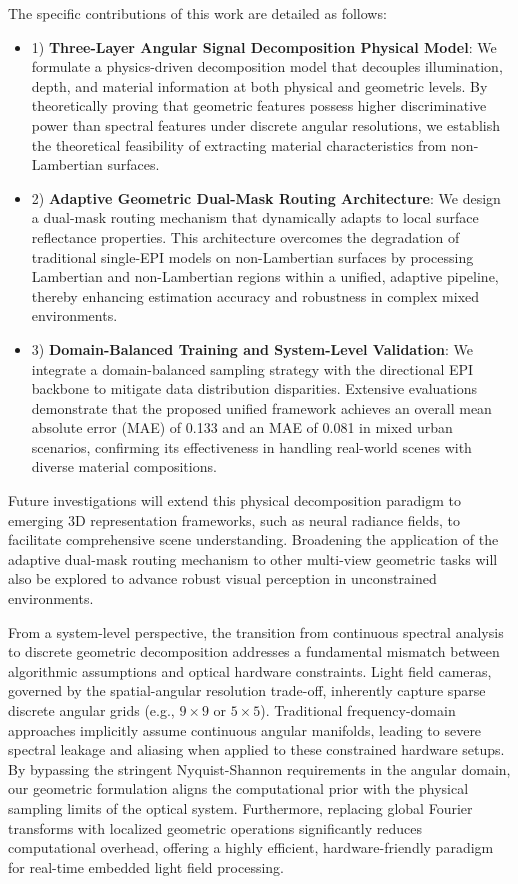 \documentclass[lettersize,journal]{IEEEtran}
\begin{document}
The specific contributions of this work are detailed as follows:
\begin{itemize}
\item 1) \textbf{Three-Layer Angular Signal Decomposition Physical Model}: We formulate a physics-driven decomposition model that decouples illumination, depth, and material information at both physical and geometric levels. By theoretically proving that geometric features possess higher discriminative power than spectral features under discrete angular resolutions, we establish the theoretical feasibility of extracting material characteristics from non-Lambertian surfaces.
\item 2) \textbf{Adaptive Geometric Dual-Mask Routing Architecture}: We design a dual-mask routing mechanism that dynamically adapts to local surface reflectance properties. This architecture overcomes the degradation of traditional single-EPI models on non-Lambertian surfaces by processing Lambertian and non-Lambertian regions within a unified, adaptive pipeline, thereby enhancing estimation accuracy and robustness in complex mixed environments.
\item 3) \textbf{Domain-Balanced Training and System-Level Validation}: We integrate a domain-balanced sampling strategy with the directional EPI backbone to mitigate data distribution disparities. Extensive evaluations demonstrate that the proposed unified framework achieves an overall mean absolute error (MAE) of 0.133 and an MAE of 0.081 in mixed urban scenarios, confirming its effectiveness in handling real-world scenes with diverse material compositions.
\end{itemize}

Future investigations will extend this physical decomposition paradigm to emerging 3D representation frameworks, such as neural radiance fields, to facilitate comprehensive scene understanding. Broadening the application of the adaptive dual-mask routing mechanism to other multi-view geometric tasks will also be explored to advance robust visual perception in unconstrained environments.

From a system-level perspective, the transition from continuous spectral analysis to discrete geometric decomposition addresses a fundamental mismatch between algorithmic assumptions and optical hardware constraints. Light field cameras, governed by the spatial-angular resolution trade-off, inherently capture sparse discrete angular grids (e.g., $9 \times 9$ or $5 \times 5$). Traditional frequency-domain approaches implicitly assume continuous angular manifolds, leading to severe spectral leakage and aliasing when applied to these constrained hardware setups. By bypassing the stringent Nyquist-Shannon requirements in the angular domain, our geometric formulation aligns the computational prior with the physical sampling limits of the optical system. Furthermore, replacing global Fourier transforms with localized geometric operations significantly reduces computational overhead, offering a highly efficient, hardware-friendly paradigm for real-time embedded light field processing.
\end{document}
